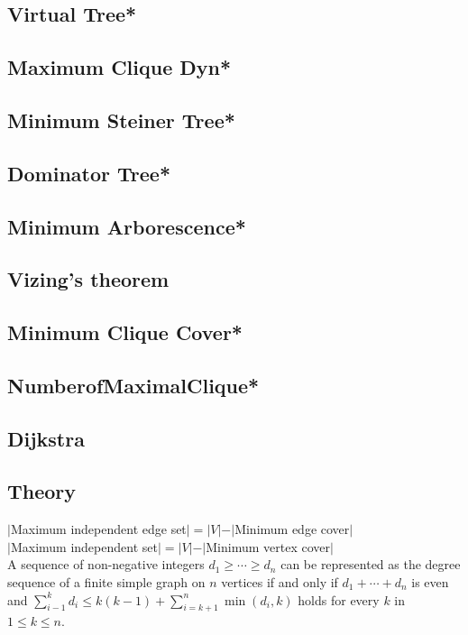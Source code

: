 \subsection{Virtual Tree*} %

\subsection{Maximum Clique Dyn*} %
 
\subsection{Minimum Steiner Tree*} %

\subsection{Dominator Tree*} %

\subsection{Minimum Arborescence*} %

\subsection{Vizing's theorem}

\subsection{Minimum Clique Cover*} %

\subsection{NumberofMaximalClique*} %

\subsection{Dijkstra} %

\subsection{Theory}
\begin{footnotesize}
$|$Maximum independent edge set$|=|V|-|$Minimum edge cover$|$\\
$|$Maximum independent set$|=|V|-|$Minimum vertex cover$|$\\
A sequence of non-negative integers $d_1\ge\cdots\ge d_n$ can be represented as the degree sequence of a finite simple graph on $n$ vertices if and only if $d_1+\cdots+d_n$ is even and $\displaystyle\sum_{i-1}^kd_i\le k(k-1)+\displaystyle\sum_{i=k+1}^n\min(d_i,k)$ holds for every $k$ in $1\le k\le n$.
\end{footnotesize}


